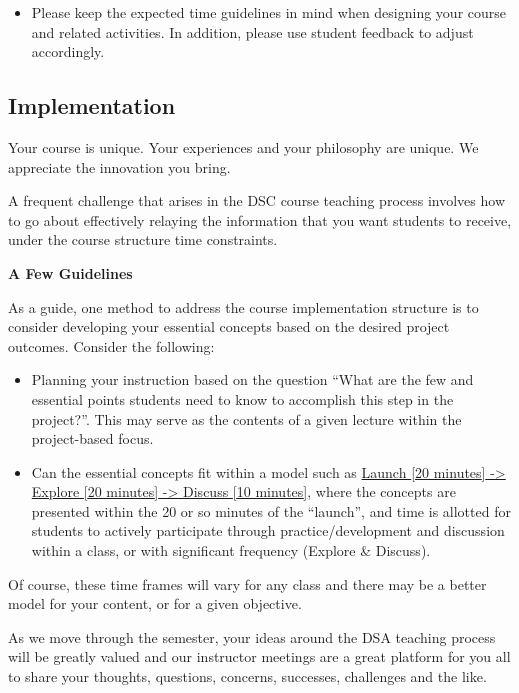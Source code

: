 \documentclass[
]{book}
\providecommand{\tightlist}{%
  \setlength{\itemsep}{0pt}\setlength{\parskip}{0pt}}
\begin{document}
\begin{itemize}
\tightlist
\item
  Please keep the expected time guidelines in mind when designing your course and related activities. In addition, please use student feedback to adjust accordingly.
\end{itemize}

\hypertarget{implementation}{%
\subsection{Implementation}\label{implementation}}

Your course is unique. Your experiences and your philosophy are unique. We appreciate the innovation you bring.

A frequent challenge that arises in the DSC course teaching process involves how to go about effectively relaying the information that you want students to receive, under the course structure time constraints.

\textbf{A Few Guidelines}

As a guide, one method to address the course implementation structure is to consider developing your essential concepts based on the desired project outcomes. Consider the following:

\begin{itemize}
\item
  Planning your instruction based on the question ``What are the few and essential points students need to know to accomplish this step in the project?''. This may serve as the contents of a given lecture within the project-based focus.
\item
  Can the essential concepts fit within a model such as \href{https://drive.google.com/file/d/13AwDhsoMFh31YdHoxdP_5FaaqUdqkM1W/view}{Launch {[}20 minutes{]} -\textgreater{} Explore {[}20 minutes{]} -\textgreater{} Discuss {[}10 minutes{]}}, where the concepts are presented within the 20 or so minutes of the ``launch'', and time is allotted for students to actively participate through practice/development and discussion within a class, or with significant frequency (Explore \& Discuss).
\end{itemize}

Of course, these time frames will vary for any class and there may be a better model for your content, or for a given objective.

As we move through the semester, your ideas around the DSA teaching process will be greatly valued and our instructor meetings are a great platform for you all to share your thoughts, questions, concerns, successes, challenges and the like.
\end{document}
